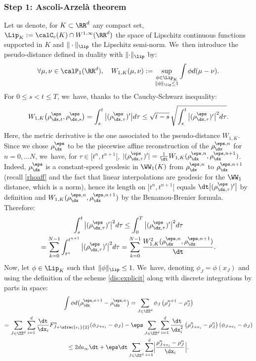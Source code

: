 \subsubsection*{Step 1: Ascoli-Arzelà theorem} Let us denote, for $K \subset \RR^d$ any compact set, $\Lip_K := \calC_c(K) \cap W^{1,\infty}(\RR^d)$ the space of Lipschitz continuous functions supported in $K$ and $\|\cdot\|_{\lip}$ the Lipschitz semi-norm. We~then introduce the pseudo-distance defined in duality with $\|{\cdot}\|_{\lip}$ by:
\[
\forall \mu, \nu \in \calP_1(\RR^d), \quad W_{1,K}(\mu, \nu) := \sup_{\substack{\phi \in \Lip_K\\ \|\phi\|_{\lip} \leq 1}} \int \phi d(\mu-\nu).
\]
For $0\leq s < t \leq T$, we~have, thanks to the Cauchy-Schwarz inequality:
\begin{equation}\label{ineq:HolderW1K}
W_{1,K}\big(\rho_{\dx,t}^\eps, \rho_{\dx,s}^\eps\big) = \int_s^t \big|(\rho_{\dx, \tau}^\eps)'\big| d\tau \leq \sqrt{t-s} \, \sqrt{\int_s^t \big|(\rho_{\dx,\tau}^\eps)'\big|^2 d\tau}.
\end{equation}
Here, the metric derivative is the one associated to the pseudo-distance $W_{1,K}$. Since we chose $\rho_{\dx}^\eps$ to be the piecewise affine reconstruction of the $\rho_{\dx}^{\eps,n}$ for $n=0, \ldots N$, we~have, for $\tau \in [t^n, t^{n+1}[$, $ |(\rho_{\dx,\tau}^\eps)'| = \frac{1}{\dt} W_{1,K}(\rho_{\dx}^{\eps,n}, \rho_{\dx}^{\eps,n+1})$. Indeed, $\rho_{\dx}^\eps$ is a constant-speed geodesic in $\WW_1(K)$ from $\rho_{\dx}^{\eps,n}$ to $\rho_{\dx}^{\eps,n+1}$ (recall \eqref{rhoaff} and the fact that linear interpolations are geodesic for the $\WW_1$ distance, which is a norm), hence its length on $[t^n, t^{n+1}[$ equals $\dt\big|(\rho_{\dx,\tau}^\eps)'\big|$ by definition and $W_{1,K}(\rho_{\dx}^{\eps,n}, \rho_{\dx}^{\eps,n+1})$ by the Benamou-Brenier formula. Therefore:
\begin{multline}\label{eq:pff}
\int_s^t \big|(\rho_{\dx,\tau}^\eps)'\big|^2 d\tau \leq \int_0^T \big|(\rho_{\dx,\tau}^\eps)'\big|^2 d\tau \\
= \sum_{k=0}^{N-1} \int_{t^n}^{t^{n+1}} \big|(\rho_{\dx,\tau}^\eps)'\big|^2 d\tau = \sum_{k=0}^{N-1} \frac{W_{1,K}^2(\rho_{\dx}^{\eps,n}, \rho_{\dx}^{\eps,n+1})}{\dt}.
\end{multline}
Now, let $\phi \in \Lip_K$ such that $\|\phi\|_{\lip} \leq 1$. We~have, denoting $\phi_J = \phi(x_J)$ and using the definition of the scheme \eqref{dis:explicit} along with discrete integrations by parts in space:
\begin{multline*}
\int \phi d\big(\rho_{\dx}^{\eps,n+1}-\rho_{\dx}^{\eps,n}\big) = \sum_{J\in\ZZ^d} \phi_J \left(\rho_J^{n+1} - \rho_J^{n}\right) \\
= \sum_{J \in \ZZ^d} \sum_{i=1}^{d} \frac{\dt}{\dx_i}
F_{J+ \sfrac{e_i}{2}}^{n}(\phi_{J+e_i} - \phi_J) - \eps \sum_{J \in \ZZ^d} \sum_{i=1}^{d} \frac{\dt}{\dx_i^2} \left(\rho_{J+e_i}^{n} - \rho_J^{n}\right)(\phi_{J+e_i} - \phi_J) \\
\leq 2da_\infty \dt + \eps \dt \sum_{J \in \ZZ^d} \sum_{i=1}^{d} \Bigl|\frac{\rho_{J+e_i}^{n} - \rho_J^{n}}{\dx_i}\Bigr|.
\end{multline*}
